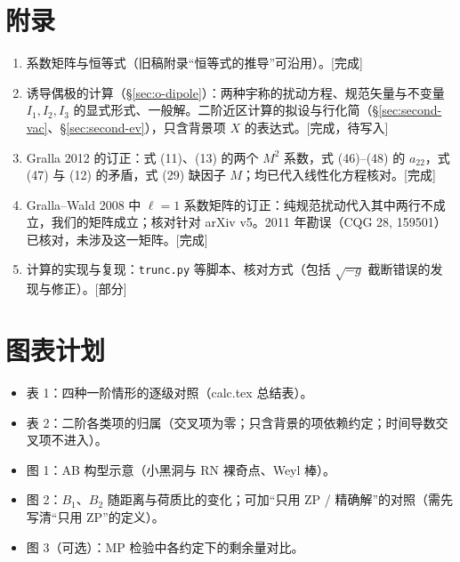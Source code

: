 \documentclass[11pt,a4paper]{ctexart}
\newcommand{\status}[1]{\hfill{\small\color{blue!50!black}[#1]}}
\begin{document}
\section*{附录}
\begin{enumerate}[label=\Alph*.,nosep]
\item 系数矩阵与恒等式（旧稿附录“恒等式的推导”可沿用）。\status{完成}
\item 诱导偶极的计算（\S\ref{sec:o-dipole}）：两种宇称的扰动方程、规范矢量与不变量 $I_1,I_2,I_3$ 的显式形式、一般解。二阶近区计算的拟设与行化简（\S\ref{sec:second-vac}、\S\ref{sec:second-ev}），只含背景项 $X$ 的表达式。\status{完成，待写入}
\item Gralla 2012 的订正：式 (11)、(13) 的两个 $M^2$ 系数，式 (46)--(48) 的 $a_{22}$，式 (47) 与 (12) 的矛盾，式 (29) 缺因子 $M$；均已代入线性化方程核对。\status{完成}
\item Gralla--Wald 2008 中 $\ell=1$ 系数矩阵的订正：纯规范扰动代入其中两行不成立，我们的矩阵成立；核对针对 arXiv v5。2011 年勘误（CQG 28, 159501）已核对，未涉及这一矩阵。\status{完成}
\item 计算的实现与复现：\texttt{trunc.py} 等脚本、核对方式（包括 $\sqrt{-g}$ 截断错误的发现与修正）。\status{部分}
\end{enumerate}

\section*{图表计划}
\begin{itemize}[nosep]
\item 表 1：四种一阶情形的逐级对照（calc.tex 总结表）。
\item 表 2：二阶各类项的归属（交叉项为零；只含背景的项依赖约定；时间导数交叉项不进入）。
\item 图 1：AB 构型示意（小黑洞与 RN 裸奇点、Weyl 棒）。
\item 图 2：$B_1$、$B_2$ 随距离与荷质比的变化；可加“只用 ZP / 精确解”的对照（需先写清“只用 ZP”的定义）。
\item 图 3（可选）：MP 检验中各约定下的剩余量对比。
\end{itemize}

\end{document}
